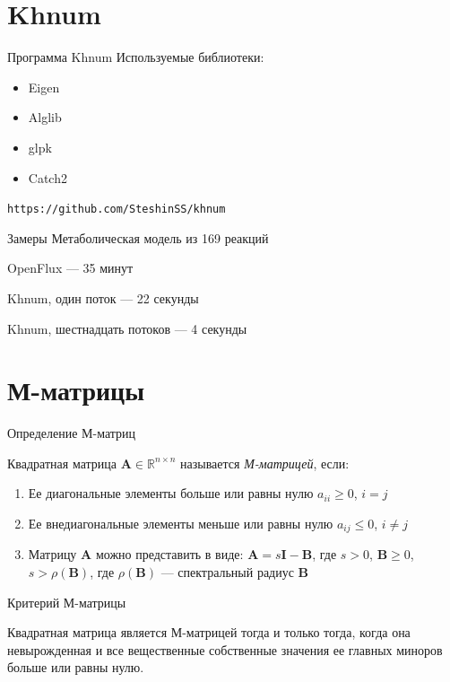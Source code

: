 \documentclass[aspectratio=169]{beamer}
\begin{document}
\section{Khnum}
\begin{frame}{Программа Khnum}
Используемые библиотеки:
\begin{itemize}
	\item Eigen
	\item Alglib
	\item glpk
	\item Catch2
\end{itemize}

\texttt{https://github.com/SteshinSS/khnum}
\end{frame}

\begin{frame}{Замеры}
Метаболическая модель из 169 реакций

OpenFlux --- 35 минут

Khnum, один поток --- 22 секунды

Khnum, шестнадцать потоков --- 4 секунды
\end{frame}

\section{М-матрицы}
\begin{frame}{Определение М-матриц}
\begin{theorem}[Ostrowsky, 1937]
	Квадратная матрица $\mathbf{A} \in \mathbb{R}^{n \times n}$ называется \emph{М-матрицей}, если:
	\begin{enumerate}
		\item Ее диагональные элементы больше или равны нулю $a_{ii} \ge 0$, $i = j$
		\item Ее внедиагональные элементы меньше или равны нулю $a_{ij} \le 0$, $i \neq j$
		\item Матрицу $\mathbf{A}$ можно представить в виде: $\mathbf{A} = s\mathbf{I} - \mathbf{B}$, где $s > 0$, $\mathbf{B} \ge 0$, $s > \rho(\mathbf{B})$, где $\rho(\mathbf{B})$ --- спектральный радиус $\mathbf{B}$
	\end{enumerate}
\end{theorem}
\end{frame}

\begin{frame}{Критерий М-матрицы}
\begin{theorem}
	Квадратная матрица является М-матрицей тогда и только тогда, когда она невырожденная и все вещественные собственные значения ее главных миноров больше или равны нулю. 
\end{theorem}
\end{frame}
\end{document}
